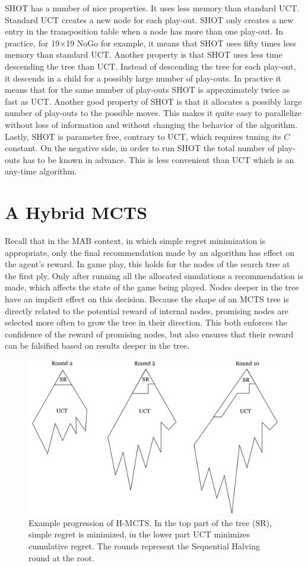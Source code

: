 \documentclass[a4paper]{llncs}
\begin{document}
SHOT has a number of nice properties. It uses less memory than
standard UCT. Standard UCT creates a new node for each play-out. SHOT
only creates a new entry in the transposition table when a node has
more than one play-out. In practice, for 19$\times$19 NoGo for example, it
means that SHOT uses fifty times less memory than standard
UCT. Another property is that SHOT uses less time descending the tree
than UCT. Instead of descending the tree for each play-out, it descends
in a child for a possibly large number of play-outs. In practice it
means that for the same number of play-outs SHOT is approximately twice
as fast as UCT. Another good property of SHOT is that it allocates a
possibly large number of play-outs to the possible moves. This makes it
quite easy to parallelize without loss of information and without
changing the behavior of the algorithm. Lastly, SHOT is parameter free, contrary to UCT, which requires tuning its $C$ constant. On the
negative side, in order to run SHOT the total number of play-outs has
to be known in advance. This is less convenient than UCT which is an
any-time algorithm.

\section{A Hybrid MCTS}
\label{sec:h-mcts}

Recall that in the MAB context, in which simple regret minimization is appropriate, only the final recommendation made by an algorithm has effect on the agent's reward. In game play, this holds for the nodes of the search tree at the first ply. Only after running all the allocated simulations a recommendation is made, which affects the state of the game being played. Nodes deeper in the tree have an implicit effect on this decision. Because the shape of an MCTS tree is directly related to the potential reward of internal nodes, promising nodes are selected more often to grow the tree in their direction. This both enforces the confidence of the reward of promising nodes, but also ensures that their reward can be falsified based on results deeper in the tree.

\begin{figure}[t!]
	\centering
	\includegraphics[width=.8\textwidth]{img/H-MCTS.png}
	\caption{Example progression of H-MCTS. In the top part of the tree (SR), simple regret is minimized, in the lower part UCT minimizes cumulative regret. The rounds represent the Sequential Halving round at the root.}
	\label{fig:h-mcts_trees}
\end{figure}
\end{document}
